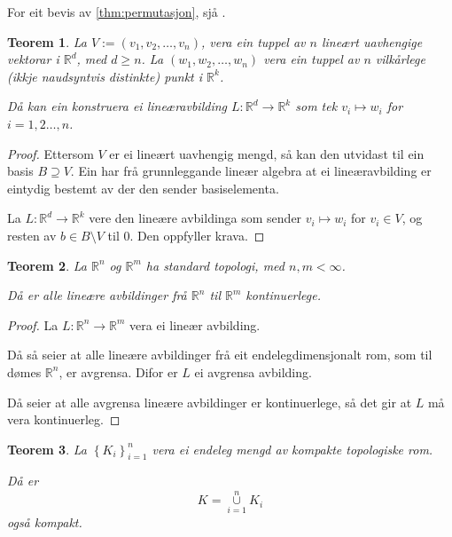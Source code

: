 \documentclass[a4paper, 12pt, norsk]{article}
\theoremstyle{plain}
\newtheorem{theorem}{Teorem}[section]
\theoremstyle{definition}
\newcommand{\Rb}{\mathbb{R}}
\newcommand{\union}{ \mathop{\cup}\limits }
\newcommand{\set}[1]{ \left\{ #1 \right\} } %
\newcommand{\tuple}[1]{ \left( #1 \right) } %
\begin{document}
For eit bevis av \autoref{thm:permutasjon}, sjå \cite[s. 130]{MR1304051}.

\begin{theorem} \label{thm:definer-lin-op}
	La \( V := \tuple{v_1, v_2, \dots, v_n} \), vera ein tuppel av \( n \) lineært uavhengige vektorar i \( \Rb^d \), med \( d \geq n \). La \( \tuple{w_1, w_2, \dots, w_n} \) vera ein tuppel av \( n \) vilkårlege (ikkje naudsyntvis distinkte) punkt i \( \Rb^k \).
	
	Då kan ein konstruera ei lineæravbilding \( L : \Rb^d \to \Rb^k \) som tek \( v_i \mapsto w_i \) for \( i = 1, 2 \dots, n \).
\end{theorem}

\begin{proof}
	Ettersom \( V \) er ei lineært uavhengig mengd, så kan den utvidast til ein basis \( B \supseteq V \). Ein har frå grunnleggande lineær algebra at ei lineæravbilding er eintydig bestemt av der den sender basiselementa.

	La \( L : \Rb^d \to \Rb^k \) vere den lineære avbildinga som sender \( v_i \mapsto w_i \) for \( v_i \in V \), og resten av \( b \in B \setminus V \) til \( 0 \). Den oppfyller krava.
\end{proof}

\begin{theorem} \label{thm:avgrensa-lin-op-er-kont}
	La \( \Rb^n \) og \( \Rb^m \) ha standard topologi, med \( n, m < \infty \).

	Då er alle lineære avbildinger frå \( \Rb^n \) til \( \Rb^m \) kontinuerlege.
\end{theorem}

\begin{proof}
	La \( L : \Rb^n \to \Rb^m \) vera ei lineær avbilding.

	Då så seier \cite[Theroem 6.3.1]{MR3838450} at alle lineære avbildinger frå eit endelegdimensjonalt rom, som til dømes \( \Rb^n \), er avgrensa. Difor er \( L \) ei avgrensa avbilding.

	Då seier \cite[Theorem 6.4.1]{MR3838450} at alle avgrensa lineære avbildinger er kontinuerlege, så det gir at \( L \) må vera kontinuerleg.
\end{proof}

\begin{theorem} \label{thm:endeleg-union-kompakt-er-kompakt}
	La \( \set{K_i}_{i = 1}^n \) vera ei endeleg mengd av kompakte topologiske rom. 
	
	Då er
	\[
		K = \union_{i=1}^n K_i
	\]
	også kompakt.
\end{theorem}
\end{document}
